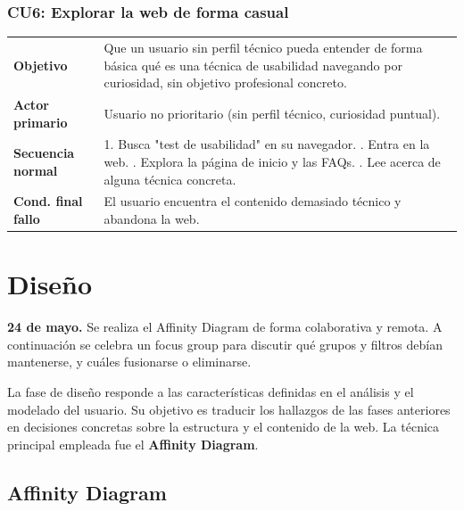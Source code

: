 \documentclass[12pt, a4paper]{report}
\begin{document}
\subsection{CU6: Explorar la web de forma casual}

\begin{longtable}{lp{10cm}}
\toprule
\textbf{Objetivo} & Que un usuario sin perfil técnico pueda entender de forma básica qué es una técnica de usabilidad navegando por curiosidad, sin objetivo profesional concreto. \\
\textbf{Actor primario} & Usuario no prioritario (sin perfil técnico, curiosidad puntual). \\
\midrule
\textbf{Secuencia normal} &
1. Busca "test de usabilidad" en su navegador. \newline
2. Entra en la web. \newline
3. Explora la página de inicio y las FAQs. \newline
4. Lee acerca de alguna técnica concreta. \\
\textbf{Cond. final fallo} & El usuario encuentra el contenido demasiado técnico y abandona la web. \\
\bottomrule
\end{longtable}

\chapter{Diseño}
\label{ch:diseno}

\begin{notaejecucion}
\textbf{24 de mayo.} Se realiza el Affinity Diagram de forma colaborativa y remota. A
continuación se celebra un focus group para discutir qué grupos y filtros debían mantenerse,
y cuáles fusionarse o eliminarse.
\end{notaejecucion}

La fase de diseño responde a las características definidas en el análisis y el modelado del
usuario. Su objetivo es traducir los hallazgos de las fases anteriores en decisiones concretas
sobre la estructura y el contenido de la web. La técnica principal empleada fue el
\textbf{Affinity Diagram}.

\section{Affinity Diagram}
\end{document}
